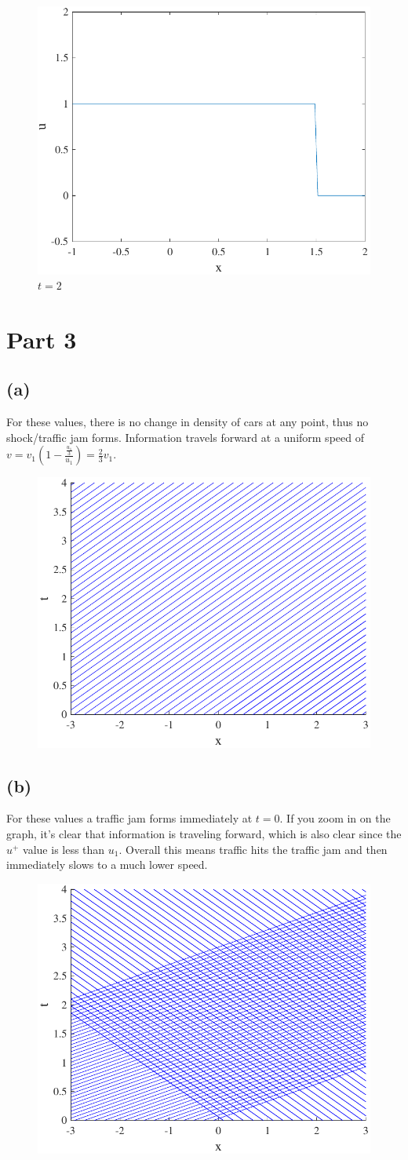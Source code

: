 \documentclass{article}
\begin{document}
\begin{figure}[!htbp]
  \centering
    \includegraphics[width=.49\textwidth]{hw_14_plot13.pdf}
    \caption{$t = 2$}
\end{figure}
\section*{Part 3}
\subsection*{(a)}
For these values, there is no change in density of cars at any point, thus no shock/traffic jam forms. Information travels forward at a uniform speed of $v = v_1(1 - \frac{\frac{u_1}{3}}{u_1}) = \frac{2}{3}v_1$.
\begin{figure}[!htbp]
  \centering
    \includegraphics[width=.49\textwidth]{hw_14_plot14.pdf}
    \caption{}
\end{figure}
\subsection*{(b)}
For these values a traffic jam forms immediately at $t=0$. If you zoom in on the graph, it's clear that information is traveling forward, which is also clear since the $u^+$ value is less than $u_1$. Overall this means traffic hits the traffic jam and then immediately slows to a much lower speed. 
\begin{figure}[!htbp]
  \centering
    \includegraphics[width=.49\textwidth]{hw_14_plot15.pdf}
    \caption{}
\end{figure}
\FloatBarrier
\end{document}
